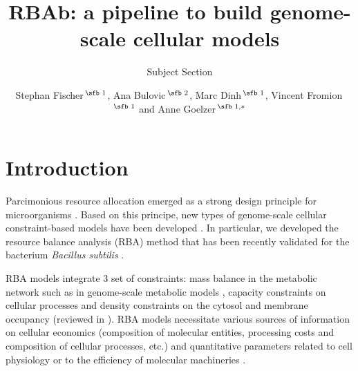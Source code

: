 \documentclass{bioinfo}
\begin{document}

\subtitle{Subject Section}

\title[RBAb pipeline]{RBAb: a pipeline to build genome-scale cellular models}
\author[Fischer \textit{et~al}.]{
  Stephan Fischer\,$^{\text{\sfb 1}}$,
  Ana Bulovic\,$^{\text{\sfb 2}}$,
  Marc Dinh\,$^{\text{\sfb 1}}$,
  Vincent Fromion\,$^{\text{\sfb 1}}$
  and Anne Goelzer\,$^{\text{\sfb 1},*}$
}
\address{
  $^{\text{\sf 1}}$ UR1404 MaIAGE, INRA, University of Paris-Saclay,
    78350 Jouy-en-Josas, France, and
  $^{\text{\sf 2}}$ Theoretical Biophysics, Humboldt-Universität zu Berlin,
    Berlin, Germany
}





\maketitle

\section{Introduction}
Parcimonious resource allocation emerged as a strong design principle
for microorganisms \citep{goelzer_cell_2009,scott_interdependence_2010}.
Based on this principe, new types of genome-scale cellular
constraint-based models have been developed
\citep{goelzer_cell_2011,obrien_genomescale_2013}.
In particular, we developed the resource balance analysis (RBA) method
that has been recently validated for the bacterium
\textit{Bacillus subtilis} \citep{goelzer_quantitative_2015}.

RBA models integrate 3 set of constraints:
mass balance in the metabolic network such as
in genome-scale metabolic models \citep{varma_stoichiometric_1994},
capacity constraints on cellular processes and
density constraints on the cytosol and membrane occupancy
(reviewed in \citet{goelzer_resource_2017}).
RBA models necessitate various sources of information on cellular economics
(composition of molecular entities, processing costs and composition
of cellular processes, etc.)
and quantitative parameters related to cell physiology
or to the efficiency of molecular machineries \citep{goelzer_resource_2017}.
\end{document}
